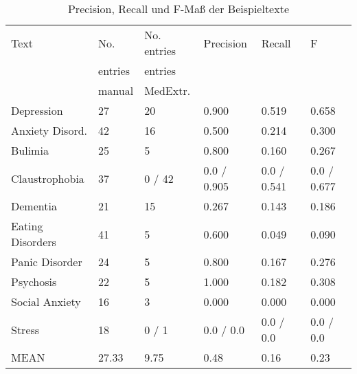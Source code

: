 \begin{table}
\begin{center}
\begin{tabular}{llllll}
\toprule
            Text & No.        		 & No. entries              & Precision & Recall & F \\
             & entries           & entries             		& 			& 		 &\\          
                 & manual            &  MedExtr.            &           &   	&      \\
\midrule
      Depression &                 27 &                       20 &     0.900 &  0.519 &     0.658 \\
Anxiety Disord. &                 42 &                       16 &     0.500 &  0.214 &     0.300\\
         Bulimia &                 25 &                        5 &     0.800 &  0.160 &     0.267\\
  Claustrophobia &                 37 &                   0 / 42 & 0.0 / 0.905 & 0.0 / 0.541 & 0.0 / 0.677\\
        Dementia &                 21 &                       15 &     0.267 &  0.143 &     0.186\\
 Eating Disorders &                 41 &                        5 &     0.600 &  0.049 &     0.090\\
   Panic Disorder &                 24 &                        5 &     0.800 &  0.167 &     0.276\\
       Psychosis &                 22 &                        5 &     1.000 &  0.182 &     0.308\\
   Social Anxiety &                 16 &                        3 &     0.000 &  0.000 & 0.000  \\
          Stress &                 18 &                    0 / 1 & 0.0 / 0.0 & 0.0 / 0.0 & 0.0 / 0.0\\
\midrule
       MEAN &                27.33 &     9.75 & 0.48 & 0.16 & 0.23 \\
\bottomrule
\end{tabular}
\caption{Precision, Recall und F-Maß der Beispieltexte}
\label{tab:precision_recall}
\end{center}
\end{table}




